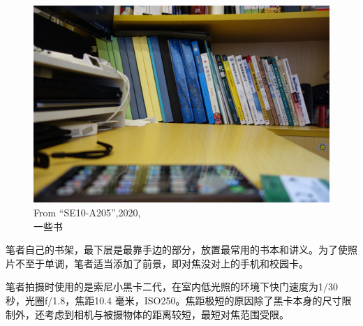 \documentclass[cn,black,10pt,normal]{elegantnote}
\begin{document}
\begin{figure}[H]
    \centering
    \includegraphics[width=1\textwidth,angle=0]{image/DSC08230.JPG}
    \caption{From “SE10-A205”,2020,  \\ 一些书}
    \label{F-02}
\end{figure}

笔者自己的书架，最下层是最靠手边的部分，放置最常用的书本和讲义。为了使照片不至于单调，笔者适当添加了前景，即对焦没对上的手机和校园卡。

笔者拍摄时使用的是索尼小黑卡二代，在室内低光照的环境下快门速度为1/30 秒，光圈f/1.8，焦距10.4 毫米，ISO250。焦距极短的原因除了黑卡本身的尺寸限制外，还考虑到相机与被摄物体的距离较短，最短对焦范围受限。

\end{document}
